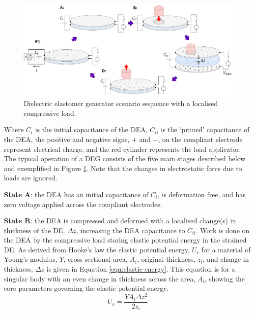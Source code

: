 \begin{figure}[H]
	\centering
	\includegraphics[width = \textwidth]{Figures/DEA-EIT-DEG_sequence_v2.png}
	\vspace{0.2cm}
	\caption{Dielectric elastomer generator scenario sequence with a localised compressive load.}
	\label{fig:dea_eit_deg}
\end{figure}
Where $C_i$ is the initial capacitance of the DEA, $C_{ii}$ is the `primed' capacitance of the DEA, the positive and negative signs, $+$ and $-$, on the compliant electrode represent electrical charge, and the red cylinder represents the load applicator. The typical operation of a DEG consists of the five main stages described below and exemplified in Figure \ref{fig:dea_eit_deg}. Note that the changes in electrostatic force due to loads are ignored.

\textbf{State A}: the DEA has an initial capacitance of $C_i$, is deformation free, and has zero voltage applied across the compliant electrodes.

\textbf{State B}: the DEA is compressed and deformed with a localised change(s) in thickness of the DE, $\Delta z$, increasing the DEA capacitance to $C_{ii}$. Work is done on the DEA by the compressive load storing elastic potential energy in the strained DE.
As derived from Hooke's law the elastic potential energy, $U_{\varepsilon}$ for a material of Young's modulus, $Y$, cross-sectional area, $A_i$, original thickness, $z_i$, and change in thickness, $\Delta z$ is given in Equation \ref{eqn:elastic-energy}. This equation is for a singular body with an even change in thickness across the area, $A_i$, showing the core parameters governing the elastic potential energy.
\begin{equation}
	U_{\varepsilon} = \frac{YA_i\Delta z^2}{2z_i}
	\label{eqn:elastic-energy}
\end{equation}

